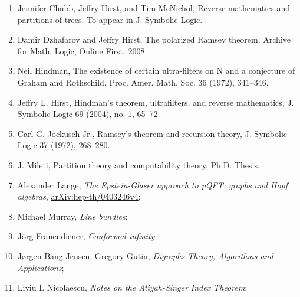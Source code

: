 \documentclass[a4paper,11pt]{article}
\begin{document}
\begin{enumerate}
\item Jennifer Chubb, Jeffry Hirst, and Tim McNichol, Reverse
  mathematics and partitions of trees. To appear in J. Symbolic Logic.



\item Damir Dzhafarov and Jeffry Hirst, The polarized Ramsey theorem.
  Archive for Math. Logic, Online First: 2008.



\item Neil Hindman, The existence of certain ultra-filters on N and a
  conjecture of Graham and Rothschild, Proc. Amer. Math. Soc. 36
  (1972), 341–346.



\item Jeffry L. Hirst, Hindman’s theorem, ultrafilters, and reverse
  mathematics, J. Symbolic Logic 69 (2004), no. 1, 65–72.



\item Carl G. Jockusch Jr., Ramsey’s theorem and recursion theory, J.
  Symbolic Logic 37 (1972), 268–280.



\item J. Mileti, Partition theory and computability theory. Ph.D.
  Thesis.



\item Alexander Lange, \textit{The Epstein-Glaser approach to pQFT:
    graphs and Hopf algebras},
  \href{https://arxiv.org/abs/hep-th/0403246v4}{arXiv:hep-th/0403246v4};



\item Michael Murray, \textit{Line bundles};



\item J\"{o}rg Frauendiener, \textit{Conformal infinity};



\item J\o rgen Bang-Jensen, Gregory Gutin, \textit{Digraphs Theory,
    Algorithms and Applications};



\item Liviu I. Nicolaescu, \textit{Notes on the Atiyah-Singer Index
    Theorem};




\end{enumerate}
\end{document}
